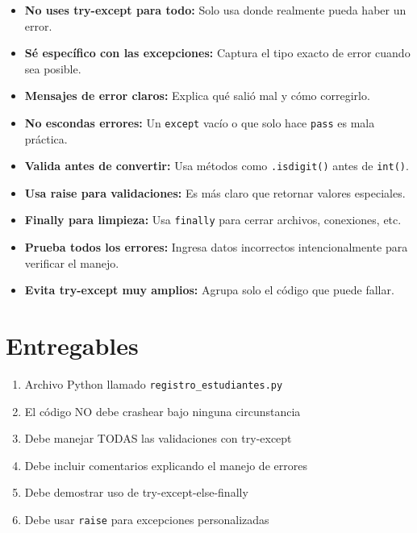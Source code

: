 \documentclass[12pt,a4paper]{article}
\begin{document}
\begin{itemize}[leftmargin=*]
    \item \textbf{No uses try-except para todo:} Solo usa donde realmente pueda haber un error.
    
    \item \textbf{Sé específico con las excepciones:} Captura el tipo exacto de error cuando sea posible.
    
    \item \textbf{Mensajes de error claros:} Explica qué salió mal y cómo corregirlo.
    
    \item \textbf{No escondas errores:} Un \texttt{except} vacío o que solo hace \texttt{pass} es mala práctica.
    
    \item \textbf{Valida antes de convertir:} Usa métodos como \texttt{.isdigit()} antes de \texttt{int()}.
    
    \item \textbf{Usa raise para validaciones:} Es más claro que retornar valores especiales.
    
    \item \textbf{Finally para limpieza:} Usa \texttt{finally} para cerrar archivos, conexiones, etc.
    
    \item \textbf{Prueba todos los errores:} Ingresa datos incorrectos intencionalmente para verificar el manejo.
    
    \item \textbf{Evita try-except muy amplios:} Agrupa solo el código que puede fallar.
\end{itemize}

\section{Entregables}

\begin{enumerate}[leftmargin=*]
    \item Archivo Python llamado \texttt{registro\_estudiantes.py}
    \item El código NO debe crashear bajo ninguna circunstancia
    \item Debe manejar TODAS las validaciones con try-except
    \item Debe incluir comentarios explicando el manejo de errores
    \item Debe demostrar uso de try-except-else-finally
    \item Debe usar \texttt{raise} para excepciones personalizadas
\end{enumerate}
\end{document}
